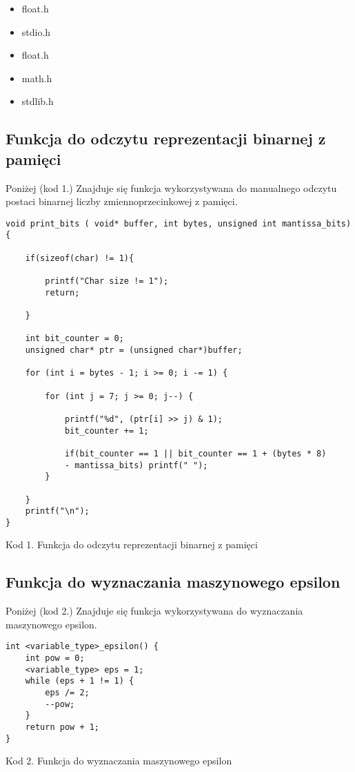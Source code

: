 \documentclass{article}
\begin{document}
\begin{itemize}
\item float.h
\item stdio.h
\item float.h
\item math.h
\item stdlib.h
\end{itemize}

\subsection{Funkcja do odczytu reprezentacji binarnej z pamięci}

Poniżej (kod 1.) Znajduje się funkcja wykorzystywana do manualnego odczytu postaci binarnej liczby zmiennoprzecinkowej z pamięci.

\begin{verbatim}
void print_bits ( void* buffer, int bytes, unsigned int mantissa_bits){   

    if(sizeof(char) != 1){

        printf("Char size != 1");
        return;

    }

    int bit_counter = 0;
    unsigned char* ptr = (unsigned char*)buffer;

    for (int i = bytes - 1; i >= 0; i -= 1) {
        
        for (int j = 7; j >= 0; j--) {
            
            printf("%d", (ptr[i] >> j) & 1);
            bit_counter += 1;

            if(bit_counter == 1 || bit_counter == 1 + (bytes * 8)
            - mantissa_bits) printf(" ");
        }
        
    }
    printf("\n");
}
\end{verbatim}
\centerline{Kod 1. Funkcja do odczytu reprezentacji binarnej z pamięci}

\subsection{Funkcja do wyznaczania maszynowego epsilon}

Poniżej (kod 2.) Znajduje się funkcja wykorzystywana do wyznaczania maszynowego epsilon.

\begin{verbatim}
int <variable_type>_epsilon() {
    int pow = 0;
    <variable_type> eps = 1;
    while (eps + 1 != 1) {
        eps /= 2;
        --pow;
    }
    return pow + 1;
}
\end{verbatim}
\centerline{Kod 2. Funkcja do wyznaczania maszynowego epsilon}
\end{document}
